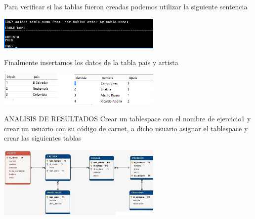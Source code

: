 \begin{enumerate}[1.]
\begin{center}
	\end{center}
	Para verificar si las tablas fueron creadas podemos utilizar la siguiente sentencia\\
	\begin{center}
	\includegraphics[width=8cm]{./Imagenes/eje11}
	\end{center}
	Finalmente insertamos los datos de la tabla pa\'is y artista\\
	\begin{center}
	\includegraphics[width=8cm]{./Imagenes/eje12}
	\end{center}
	ANALISIS DE RESULTADOS
	Crear un tablespace con el nombre de ejercicio1 y crear un usuario con su c\'odigo de carnet, a dicho usuario asignar el tablespace y crear las 		siguientes tablas\\
	\begin{center}
	\includegraphics[width=8cm]{./Imagenes/eje13}
	\end{center}
\end{enumerate} 
